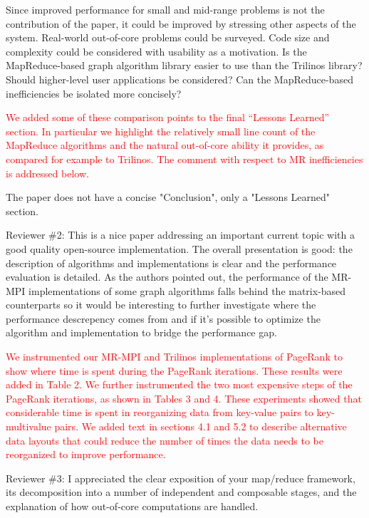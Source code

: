 \documentclass[11pt]{article}
\newcommand{\revise}[1]{\textcolor{red}{#1}}
\begin{document}
Since improved performance for small and mid-range problems is not the
contribution of the paper, it could be improved by stressing other
aspects of the system.  Real-world out-of-core problems could be
surveyed.  Code size and complexity could be considered with usability
as a motivation.  Is the MapReduce-based graph algorithm library
easier to use than the Trilinos library?  Should higher-level user
applications be considered?  Can the MapReduce-based inefficiencies be
isolated more concisely?

\revise{We added some of these comparison points to the final
``Lessons Learned'' section.  In particular we highlight the
relatively small line count of the MapReduce algorithms and the
natural out-of-core ability it provides, as compared for example to
Trilinos.  The comment with respect to MR inefficiencies is addressed
below.}

The paper does not have a concise "Conclusion", only a "Lessons Learned"
section.

\vspace{0.5 in}

Reviewer \#2: This is a nice paper addressing an important current topic
with a good quality open-source implementation.  The overall presentation
is good: the description of algorithms and implementations is clear and the
performance evaluation is detailed. As the authors pointed out, the
performance of the MR-MPI implementations of some graph algorithms falls
behind the matrix-based counterparts so it would be interesting to further
investigate where the performance descrepency comes from and if it's
possible to optimize the algorithm and implementation to bridge the
performance gap.

\revise{We instrumented our MR-MPI and Trilinos implementations of
PageRank to show where time is spent during the PageRank iterations.
These results were added in Table 2.  We further instrumented the two
most expensive steps of the PageRank iterations, as shown in Tables 3
and 4.  These experiments showed that considerable time is spent in
reorganizing data from key-value pairs to key-multivalue pairs.  We
added text in sections 4.1 and 5.2 to describe alternative data
layouts that could reduce the number of times the data needs to be
reorganized to improve performance.}

\vspace{0.5 in}

Reviewer \#3: I appreciated the clear exposition of your map/reduce
framework, its decomposition into a number of independent and composable
stages, and the explanation of how out-of-core computations are handled.
\end{document}
